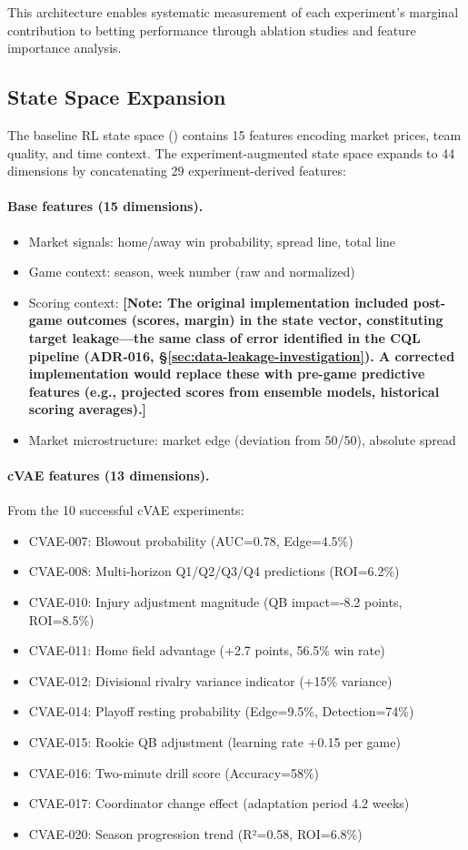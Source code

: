 This architecture enables systematic measurement of each experiment's marginal contribution to betting performance through ablation studies and feature importance analysis.

\subsection{State Space Expansion}

The baseline RL state space () contains 15 features encoding market prices, team quality, and time context. The experiment-augmented state space expands to 44 dimensions by concatenating 29 experiment-derived features:

\paragraph{Base features (15 dimensions).}
\begin{itemize}
  \item Market signals: home/away win probability, spread line, total line
  \item Game context: season, week number (raw and normalized)
  \item Scoring context: \textbf{[Note: The original implementation included post-game outcomes (scores, margin) in the state vector, constituting target leakage---the same class of error identified in the CQL pipeline (ADR-016, \S\ref{sec:data-leakage-investigation}). A corrected implementation would replace these with pre-game predictive features (e.g., projected scores from ensemble models, historical scoring averages).]}
  \item Market microstructure: market edge (deviation from 50/50), absolute spread
\end{itemize}

\paragraph{cVAE features (13 dimensions).}
From the 10 successful cVAE experiments:
\begin{itemize}
  \item CVAE-007: Blowout probability (AUC=0.78, Edge=4.5\%)
  \item CVAE-008: Multi-horizon Q1/Q2/Q3/Q4 predictions (ROI=6.2\%)
  \item CVAE-010: Injury adjustment magnitude (QB impact=-8.2 points, ROI=8.5\%)
  \item CVAE-011: Home field advantage (+2.7 points, 56.5\% win rate)
  \item CVAE-012: Divisional rivalry variance indicator (+15\% variance)
  \item CVAE-014: Playoff resting probability (Edge=9.5\%, Detection=74\%)
  \item CVAE-015: Rookie QB adjustment (learning rate +0.15 per game)
  \item CVAE-016: Two-minute drill score (Accuracy=58\%)
  \item CVAE-017: Coordinator change effect (adaptation period 4.2 weeks)
  \item CVAE-020: Season progression trend (R²=0.58, ROI=6.8\%)
\end{itemize}

